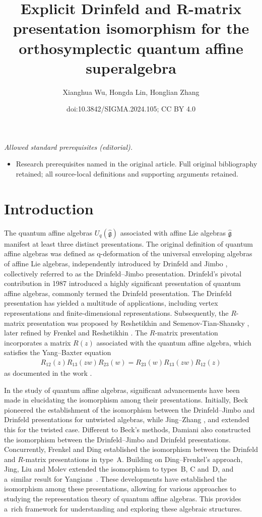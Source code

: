 \documentclass[10pt,a4paper]{amsart}
\title{Explicit Drinfeld and R-matrix presentation isomorphism for the orthosymplectic quantum affine superalgebra}
\author{Xianghua Wu, Hongda Lin, Honglian Zhang}
\date{doi:10.3842/SIGMA.2024.105; CC BY 4.0}
\numberwithin{equation}{section}
\begin{document}
\maketitle
\noindent\textit{Allowed standard prerequisites (editorial).}\begin{itemize}
\item Research prerequisites named in the original article. Full original bibliography retained; all source-local definitions and supporting arguments retained.
\end{itemize}\medskip
\section{Introduction}

The quantum affine algebras $U_q(\hat{\mathfrak{g}})$ associated with affine Lie algebras $\hat{\mathfrak{g}}$ manifest at least three distinct presentations. The original definition of quantum affine algebras was defined as q-deformation of the universal enveloping algebras of affine Lie algebras, independently introduced by Drinfeld \cite{VGD} and Jimbo \cite{MJB}, collectively referred to as the Drinfeld--Jimbo presentation.
Drinfeld's pivotal contribution in 1987 \cite{VGD2} introduced a highly significant presentation of quantum affine algebras, commonly termed the Drinfeld presentation. The Drinfeld presentation has yielded a multitude of applications, including vertex representations and finite-dimensional representations. Subsequently, the $R$-matrix presentation was proposed by Reshetikhin and Semenov-Tian-Shansky \cite{RS}, later refined by Frenkel and Reshetikhin \cite{FIBR}.
The $R$-matrix presentation incorporates a matrix $R(z)$ associated with the quantum affine algebra, which satisfies the Yang--Baxter equation
\begin{gather*}
 R_{12}(z)R_{13}(zw)R_{23}(w)=R_{23}(w)R_{13}(zw)R_{12}(z)
\end{gather*}as documented in the work \cite{RS}.

In the study of quantum affine algebras, significant advancements have been made in elucidating the isomorphism among their presentations. Initially, Beck \cite{JBECK} pioneered the establishment of the isomorphism between the Drinfeld--Jimbo and Drinfeld presentations for untwisted algebras, while Jing--Zhang \cite{NJHZ1,NJHZ}, and \cite{HNJING} extended this for the twisted case. Different to Beck's methods, Damiani \cite{Damiani1,Damiani2} also constructed the isomorphism between the Drinfeld--Jimbo and Drinfeld presentations. Concurrently, Frenkel and Ding \cite{JDIB} established the isomorphism between the Drinfeld and $R$-matrix presentations in type~A. Building on Ding--Frenkel's approach, Jing, Liu and Molev \cite{JMA,JMAB} extended the {isomorphism} to types~B, C and~D, and a~similar result for Yangians~\cite{JMAB-Y}. These developments have established the isomorphism among these presentations, allowing for various approaches to studying the representation theory of quantum affine algebras. This provides a~rich framework for understanding and exploring these algebraic structures.
\end{document}
